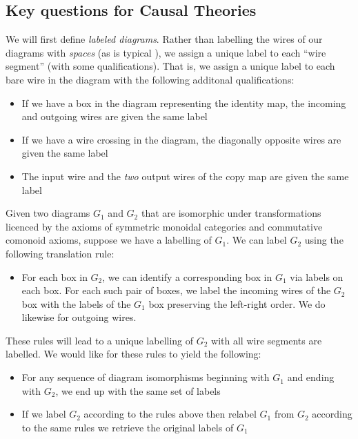 \subsection{Key questions for Causal Theories}

We will first define \emph{labeled diagrams}. Rather than labelling the wires of our diagrams with \emph{spaces} (as is typical \citep{selinger_survey_2010}), we assign a unique label to each ``wire segment'' (with some qualifications). That is, we assign a unique label to each bare wire in the diagram with the following additonal qualifications:
\begin{itemize}
	\item If we have a box in the diagram representing the identity map, the incoming and outgoing wires are given the same label
	\item If we have a wire crossing in the diagram, the diagonally opposite wires are given the same label
	\item The input wire and the \emph{two} output wires of the copy map are given the same label
\end{itemize}
Given two diagrams $G_1$ and $G_2$ that are isomorphic under transformations licenced by the axioms of symmetric monoidal categories and commutative comonoid axioms, suppose we have a labelling of $G_1$. We can label $G_2$ using the following translation rule:
\begin{itemize}
	\item For each box in $G_2$, we can identify a corresponding box in $G_1$ via labels on each box. For each such pair of boxes, we label the incoming wires of the $G_2$ box with the labels of the $G_1$ box preserving the left-right order. We do likewise for outgoing wires.
\end{itemize}

These rules will lead to a unique labelling of $G_2$ with all wire segments are labelled. We would like for these rules to yield the following:
\begin{itemize}
	\item For any sequence of diagram isomorphisms beginning with $G_1$ and ending with $G_2$, we end up with the same set of labels
	\item If we label $G_2$ according to the rules above then relabel $G_1$ from $G_2$ according to the same rules we retrieve the original labels of $G_1$
\end{itemize}

